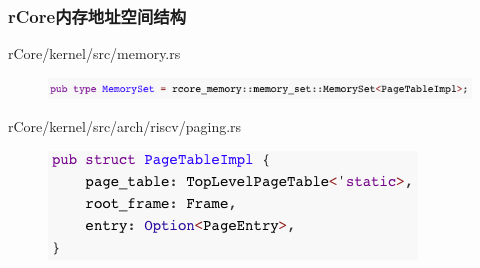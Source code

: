 \begin{frame}[fragile]
    \frametitle{rCore内存地址空间结构}
 	\begin{block}{rCore/kernel/src/memory.rs}
    \begin{figure}
    \includegraphics[width=1.0\linewidth]{figs/type-MemorySet.png}
    \end{figure}
 	\end{block}


 	\begin{block}{rCore/kernel/src/arch/riscv/paging.rs}
    \begin{figure}
    \includegraphics[width=0.65\linewidth]{figs/PageTableImpl.png}
    \end{figure}
 	\end{block}

\end{frame}
